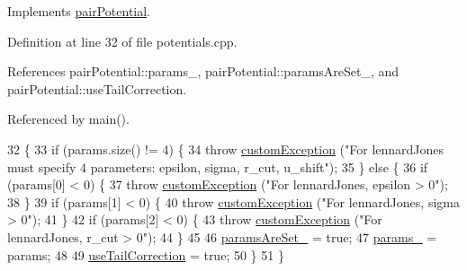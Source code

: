 Implements \hyperlink{classpair_potential_ad4b237646f9de2ae9f95cc9350564bc5}{pair\+Potential}.



Definition at line 32 of file potentials.\+cpp.



References pair\+Potential\+::params\+\_\+, pair\+Potential\+::params\+Are\+Set\+\_\+, and pair\+Potential\+::use\+Tail\+Correction.



Referenced by main().


\begin{DoxyCode}
32                                                                    \{
33                 \textcolor{keywordflow}{if} (params.size() != 4) \{
34                                 \textcolor{keywordflow}{throw} \hyperlink{classcustom_exception}{customException} (\textcolor{stringliteral}{"For lennardJones must specify 4
       parameters: epsilon, sigma, r\_cut, u\_shift"});
35                 \} \textcolor{keywordflow}{else} \{
36                                 \textcolor{keywordflow}{if} (params[0] < 0) \{
37                                                 \textcolor{keywordflow}{throw} \hyperlink{classcustom_exception}{customException} (\textcolor{stringliteral}{"For lennardJones,
       epsilon > 0"});
38                                 \}
39                                 \textcolor{keywordflow}{if} (params[1] < 0) \{
40                                                 \textcolor{keywordflow}{throw} \hyperlink{classcustom_exception}{customException} (\textcolor{stringliteral}{"For lennardJones,
       sigma > 0"});
41                                 \}
42                                 \textcolor{keywordflow}{if} (params[2] < 0) \{
43                                                 \textcolor{keywordflow}{throw} \hyperlink{classcustom_exception}{customException} (\textcolor{stringliteral}{"For lennardJones,
       r\_cut > 0"});
44                                 \}
45                                 
46                                 \hyperlink{classpair_potential_a635755c0a952bfc05a4cfae230c3dbd2}{paramsAreSet\_} = \textcolor{keyword}{true};
47                                 \hyperlink{classpair_potential_abf8ec8af983d6e9960bd149da099e883}{params\_} = params;
48                                 
49                                 \hyperlink{classpair_potential_ab4b4538a7e13771f50a29aaac2443037}{useTailCorrection} = \textcolor{keyword}{true};
50                 \}
51 \}
\end{DoxyCode}
\hypertarget{classlennard_jones_a4518a7a9970c1fbed2f2abcf0ceebbfc}{}
